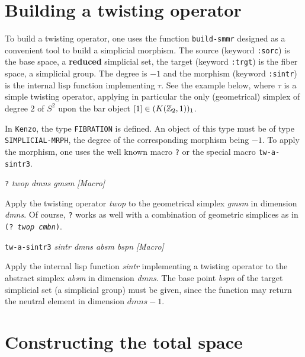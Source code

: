 \section {Building a twisting operator}

To build a twisting operator, one uses the function {\tt build-smmr} designed as a convenient tool
to build a simplicial morphism. The source (keyword {\tt :sorc}) is the base space, a {\bf reduced} simplicial
set, the target (keyword {\tt :trgt}) is the fiber space, a simplicial group. The degree is $-1$ and
the morphism (keyword {\tt :sintr}) is the internal lisp function implementing $\tau$. See the example
below, where $\tau$ is a simple twisting operator, applying in particular the only (geometrical) simplex
of degree $2$  of $S^2$ upon the bar object  $[1] \in (K({\mathbb{Z}}_2,1))_1$. \par
In {\tt Kenzo}, the type {\tt FIBRATION} is defined. An object of this type must be of type
{\tt SIMPLICIAL-MRPH}, the degree of the corresponding morphism  being  $-1$. To apply the morphism,
one uses the well known macro {\tt ?} or the special macro {\tt tw-a-sintr3}.
\vskip 0.30cm
{\parindent=0mm
{\leftskip=5mm
{\tt ?} {\em twop dmns gmsm}  \hfill {\em [Macro]} \par}
{\leftskip=15mm
Apply the twisting operator {\em twop} to the geometrical simplex {\em gmsm} in dimension
{\em dmns}. Of course, {\tt ?} works as well with a combination of geometric simplices
as in  {\tt (? {\em twop cmbn})}. \par}
{\leftskip=5mm
{\tt tw-a-sintr3} {\em sintr dmns absm bspn} \hfill {\em [Macro]} \par}
{\leftskip=15mm
Apply the internal lisp function {\em sintr} implementing a twisting o\-pe\-ra\-tor to the
abstract simplex {\em absm} in dimension {\em dmns}. The base point {\em bspn} of the
target simplicial set (a simplicial group) must be given, since the function may return the neutral
element in dimension $dmns - 1$. \par}
}
\newpage

\section {Constructing the total space}

